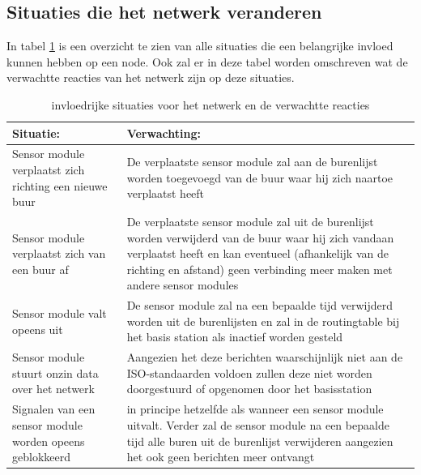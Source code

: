 \documentclass[a4paper, 11pt]{article}
\begin{document}
\newpage
\subsection{Situaties die het netwerk veranderen}
In tabel \ref{Situaties} is een overzicht te zien van alle situaties die een belangrijke invloed kunnen hebben op een node. Ook zal er in deze tabel worden omschreven wat de verwachtte reacties van het netwerk zijn op deze situaties.
\begin{table}[ht]
	\centering
	\caption{invloedrijke situaties voor het netwerk en de verwachtte reacties}
	\begin{tabular}{ | m{6cm} | m{6cm}| } 
		\hline
		\textbf{Situatie:} & \textbf{Verwachting:} \\
		\hline
		Sensor module verplaatst zich richting een nieuwe buur & De verplaatste sensor module zal aan de burenlijst worden toegevoegd van de buur waar hij zich naartoe verplaatst heeft
		\\
		\hline
		Sensor module verplaatst zich van een buur af & De verplaatste sensor module zal uit de burenlijst worden verwijderd van de buur waar hij zich vandaan verplaatst heeft en kan eventueel (afhankelijk van de richting en afstand) geen verbinding meer maken met andere sensor modules
		\\
		\hline
		Sensor module valt opeens uit  & De sensor module zal na een bepaalde tijd verwijderd worden uit de burenlijsten en zal in de routingtable bij het basis station als inactief worden gesteld
		\\ 
		\hline
		Sensor module stuurt onzin data over het netwerk & Aangezien het deze berichten waarschijnlijk niet aan de ISO-standaarden voldoen zullen deze niet worden doorgestuurd of opgenomen door het basisstation
		\\ 
		\hline
		Signalen van een sensor module worden opeens geblokkeerd & in principe hetzelfde als wanneer een sensor module uitvalt. Verder zal de sensor module na een bepaalde tijd alle buren uit de burenlijst verwijderen aangezien het ook geen berichten meer ontvangt
		\\ 
		\hline
	\end{tabular} 
	\label{Situaties}
\end{table}

\newpage


 
\end{document}
